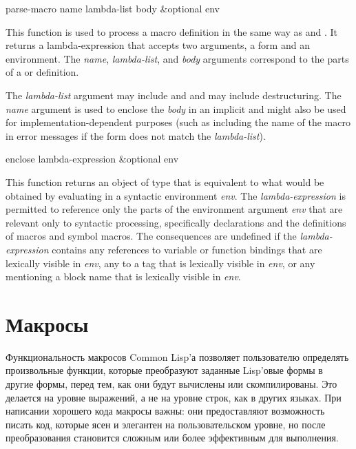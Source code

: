 \begin{defun}[Function]
parse-macro name lambda-list body &optional env

  This function is used to process a macro definition in the same way
  as  and .  It returns a lambda-expression that accepts
  two arguments, a form and an environment.  The \emph{name}, \emph{lambda-list},
  and \emph{body} arguments correspond to the parts of a  or 
  definition.

  The \emph{lambda-list} argument may include  and 
  and may include destructuring.
  The \emph{name}
  argument is used to enclose the \emph{body} in an implicit  and might also
  be used for implementation-dependent purposes (such as including the name of
  the macro in error messages if the form does not match the \emph{lambda-list}).
\end{defun}

\begin{defun}[Function]
enclose lambda-expression &optional env

  This function returns an object of type  that is equivalent to what
  would be obtained by evaluating 
  in a syntactic
  environment \emph{env}.  The \emph{lambda-expression} is permitted to reference only the
  parts of the environment argument \emph{env} that are relevant only to syntactic
  processing, specifically declarations and the definitions of macros and
  symbol macros.  The consequences are undefined if the \emph{lambda-expression}
  contains any references to variable or function bindings that are 
  lexically visible in \emph{env}, any  to a tag that is lexically visible in 
  \emph{env}, or any  mentioning a block name that is lexically 
  visible in \emph{env}.
\end{defun}

\else

\chapter{Макросы}
\label{MACROS}

Функциональность макросов Common Lisp'а позволяет пользователю определять
произвольные функции, которые преобразуют заданные Lisp'овые формы в другие
формы, перед тем, как они будут вычислены или скомпилированы. Это делается на
уровне выражений, а не на уровне строк, как в других языках. При написании
хорошего кода макросы важны: они предоставляют возможность писать код, которые
ясен и элегантен на пользовательском уровне, но после преобразования становится
сложным или более эффективным для выполнения.

